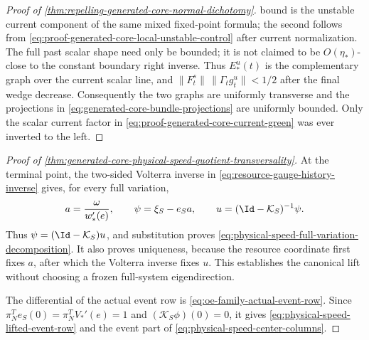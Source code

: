 \begin{proof}[Proof of
\cref{thm:repelling-generated-core-normal-dichotomy}]
bound is the unstable current component of the same mixed fixed-point
formula; the second follows from
\cref{eq:proof-generated-core-local-unstable-control} after current
normalization.  The full past scalar shape need only be bounded; it is not
claimed to be \(O(\eta_*)\)-close to the constant boundary right inverse.
Thus \(E_*^u(t)\) is the complementary graph over the current scalar line,
and \(\|F_t^s\|\,\|\Gamma_tg_t^u\|<1/2\) after the final wedge decrease.
Consequently the two graphs are uniformly transverse and the projections
in \cref{eq:generated-core-bundle-projections} are uniformly bounded.
Only the scalar current factor in
\cref{eq:proof-generated-core-current-green} was ever inverted to the
left.
\end{proof}

\begin{proof}[Proof of
\cref{thm:generated-core-physical-speed-quotient-transversality}]
At the terminal point, the two-sided Volterra inverse in
\cref{eq:resource-gauge-history-inverse} gives, for every full variation,
\[
 a=\frac{\omega}{w_*'(e)},\qquad
 \psi=\xi_S-e_Sa,\qquad
 u=(\Id-\mathcal K_S)^{-1}\psi.
\]
Thus \(\psi=(\Id-\mathcal K_S)u\), and substitution proves
\cref{eq:physical-speed-full-variation-decomposition}.  It also proves
uniqueness, because the resource coordinate first fixes \(a\), after which
the Volterra inverse fixes \(u\).  This establishes the canonical lift
without choosing a frozen full-system eigendirection.

The differential of the actual event row is
\cref{eq:oe-family-actual-event-row}.  Since
\(\pi_N^Te_S(0)=\pi_N^TV_*'(e)=1\) and
\((\mathcal K_S\phi)(0)=0\), it gives
\cref{eq:physical-speed-lifted-event-row} and the event part of
\cref{eq:physical-speed-center-columns}.


\end{proof}
